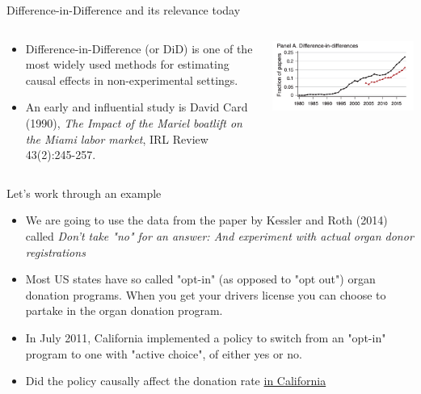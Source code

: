 \documentclass[notes,11pt, aspectratio=169]{beamer}
\begin{document}
\begin{frame}{Difference-in-Difference and its relevance today}
\begin{columns}
\begin{column}{0.5\textwidth}
  \begin{itemize}
        \item Difference-in-Difference (or DiD) is one of the most widely used methods for estimating causal effects in non-experimental settings. 

        \item An early and influential study is David Card (1990), \emph{The Impact of the Mariel boatlift on the Miami labor market}, IRL Review 43(2):245-257. 
    \end{itemize}
\end{column}

\begin{column}{0.5\textwidth}
 \begin{center}
        \includegraphics[width=1\linewidth]{AEA_DiD.png}
    \end{center}
\end{column}
\end{columns}

\end{frame}


\begin{frame}{Let's work through an example}
\begin{itemize}
    \item We are going to use the data from the paper by Kessler and Roth (2014) called \emph{Don't take "no" for an answer: And experiment with actual organ donor registrations} 

    \item Most US states have so called "opt-in" (as opposed to "opt out") organ donation programs. When you get your drivers license you can choose to partake in the organ donation program.

    \item In July 2011, California implemented a policy to switch from an "opt-in" program to one with "active choice", of either yes or no. 

    \item Did the policy causally affect the donation rate \underline{in California}
\end{itemize}
\end{frame}
\end{document}
